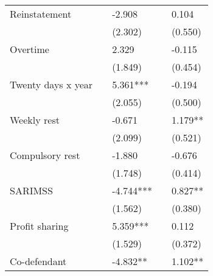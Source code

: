 \begin{tabular}{rrrrr}
\multicolumn{1}{l}{Reinstatement} & \multicolumn{1}{l}{} & \multicolumn{1}{l}{-2.908} & \multicolumn{1}{l}{} & \multicolumn{1}{l}{0.104} \\
\multicolumn{1}{l}{} & \multicolumn{1}{l}{} & \multicolumn{1}{l}{(2.302)} & \multicolumn{1}{l}{} & \multicolumn{1}{l}{(0.550)} \\
\multicolumn{1}{l}{Overtime} & \multicolumn{1}{l}{} & \multicolumn{1}{l}{2.329} & \multicolumn{1}{l}{} & \multicolumn{1}{l}{-0.115} \\
\multicolumn{1}{l}{} & \multicolumn{1}{l}{} & \multicolumn{1}{l}{(1.849)} & \multicolumn{1}{l}{} & \multicolumn{1}{l}{(0.454)} \\
\multicolumn{1}{l}{Twenty days x year} & \multicolumn{1}{l}{} & \multicolumn{1}{l}{5.361***} & \multicolumn{1}{l}{} & \multicolumn{1}{l}{-0.194} \\
\multicolumn{1}{l}{} & \multicolumn{1}{l}{} & \multicolumn{1}{l}{(2.055)} & \multicolumn{1}{l}{} & \multicolumn{1}{l}{(0.500)} \\
\multicolumn{1}{l}{Weekly rest} & \multicolumn{1}{l}{} & \multicolumn{1}{l}{-0.671} & \multicolumn{1}{l}{} & \multicolumn{1}{l}{1.179**} \\
\multicolumn{1}{l}{} & \multicolumn{1}{l}{} & \multicolumn{1}{l}{(2.099)} & \multicolumn{1}{l}{} & \multicolumn{1}{l}{(0.521)} \\
\multicolumn{1}{l}{Compulsory rest} & \multicolumn{1}{l}{} & \multicolumn{1}{l}{-1.880} & \multicolumn{1}{l}{} & \multicolumn{1}{l}{-0.676} \\
\multicolumn{1}{l}{} & \multicolumn{1}{l}{} & \multicolumn{1}{l}{(1.748)} & \multicolumn{1}{l}{} & \multicolumn{1}{l}{(0.414)} \\
\multicolumn{1}{l}{SARIMSS} & \multicolumn{1}{l}{} & \multicolumn{1}{l}{-4.744***} & \multicolumn{1}{l}{} & \multicolumn{1}{l}{0.827**} \\
\multicolumn{1}{l}{} & \multicolumn{1}{l}{} & \multicolumn{1}{l}{(1.562)} & \multicolumn{1}{l}{} & \multicolumn{1}{l}{(0.380)} \\
\multicolumn{1}{l}{Profit sharing} & \multicolumn{1}{l}{} & \multicolumn{1}{l}{5.359***} & \multicolumn{1}{l}{} & \multicolumn{1}{l}{0.112} \\
\multicolumn{1}{l}{} & \multicolumn{1}{l}{} & \multicolumn{1}{l}{(1.529)} & \multicolumn{1}{l}{} & \multicolumn{1}{l}{(0.372)} \\
\multicolumn{1}{l}{Co-defendant} & \multicolumn{1}{l}{} & \multicolumn{1}{l}{-4.832**} & \multicolumn{1}{l}{} & \multicolumn{1}{l}{1.102**} \\

\end{tabular}
